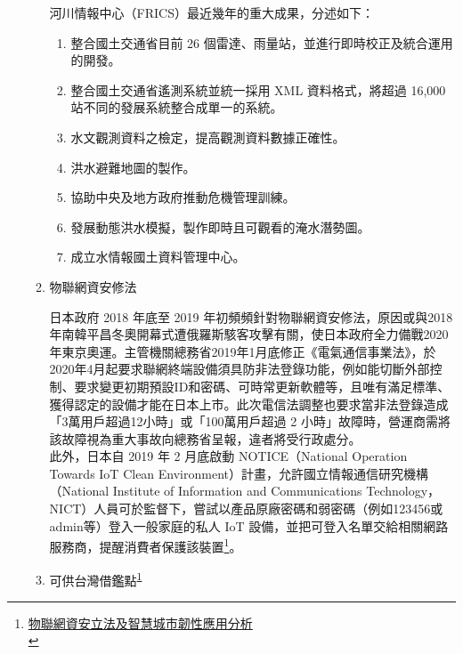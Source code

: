 \documentclass[a4paper,12pt]{article}
\begin{document}
\begin{enumerate}
\begin{enumerate}
河川情報中心（FRICS）最近幾年的重大成果，分述如下：\\
\begin{enumerate}
\item 整合國土交通省目前 26 個雷達、雨量站，並進行即時校正及統合運用的開發。\\
\item 整合國土交通省遙測系統並統一採用 XML 資料格式，將超過 16,000 站不同的發展系統整合成單一的系統。\\
\item 水文觀測資料之檢定，提高觀測資料數據正確性。\\
\item 洪水避難地圖的製作。\\
\item 協助中央及地方政府推動危機管理訓練。\\
\item 發展動態洪水模擬，製作即時且可觀看的淹水潛勢圖。\\
\item 成立水情報國土資料管理中心。\\
\end{enumerate}

\item 物聯網資安修法
\label{sec:org3bbc3f5}

日本政府 2018 年底至 2019 年初頻頻針對物聯網資安修法，原因或與2018年南韓平昌冬奧開幕式遭俄羅斯駭客攻擊有關，使日本政府全力備戰2020年東京奧運。主管機關總務省2019年1月底修正《電氣通信事業法》，於2020年4月起要求聯網終端設備須具防非法登錄功能，例如能切斷外部控制、要求變更初期預設ID和密碼、可時常更新軟體等，且唯有滿足標準、獲得認定的設備才能在日本上市。此次電信法調整也要求當非法登錄造成「3萬用戶超過12小時」或「100萬用戶超過 2 小時」故障時，營運商需將該故障視為重大事故向總務省呈報，違者將受行政處分。\\

此外，日本自 2019 年 2 月底啟動 NOTICE（National Operation Towards IoT Clean Environment）計畫，允許國立情報通信研究機構（National Institute of Information and Communications Technology，NICT）人員可於監督下，嘗試以產品原廠密碼和弱密碼（例如123456或admin等）登入一般家庭的私人 IoT 設備，並把可登入名單交給相關網路服務商，提醒消費者保護該裝置\footnote{\href{https://technews.tw/2019/04/17/iot-law-and-resilient-cities/}{物聯網資安立法及智慧城市韌性應用分析}\\\label{org7e1e3f9}}。\\

\item 可供台灣借鑑點\textsuperscript{\ref{org7e1e3f9}}
\label{sec:org3d2a203}


\end{enumerate}
\end{enumerate}
\end{document}

